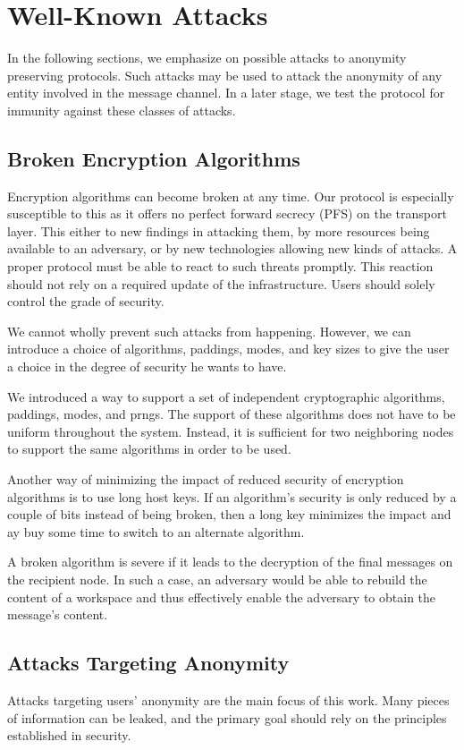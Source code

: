 \section{Well-Known Attacks}\label{sec:wellKnownAttacks}
In the following sections, we emphasize on possible attacks to anonymity preserving protocols. Such attacks may be used to attack the anonymity of any entity involved in the message channel. In a later stage, we test the protocol for immunity against these classes of attacks.

\subsection{Broken Encryption Algorithms}
Encryption algorithms can become broken at any time. Our protocol is especially susceptible to this as it offers no perfect forward secrecy (PFS) on the transport layer. This either to new findings in attacking them, by more resources being available to an adversary, or by new technologies allowing new kinds of attacks. A proper protocol must be able to react to such threats promptly. This reaction should not rely on a required update of the infrastructure. Users should solely control the grade of security. 

We cannot wholly prevent such attacks from happening. However, we can introduce a choice of algorithms, paddings, modes, and key sizes to give the user a choice in the degree of security he wants to have.

We introduced a way to support a set of independent cryptographic algorithms, paddings, modes, and prngs. The support of these algorithms does not have to be uniform throughout the system. Instead, it is sufficient for two neighboring nodes to support the same algorithms in order to be used. 

Another way of minimizing the impact of reduced security of encryption algorithms is to use long host keys. If an algorithm's security is only reduced by a couple of bits instead of being broken, then a long key minimizes the impact and ay buy some time to switch to an alternate algorithm. 

A broken algorithm is severe if it leads to the decryption of the final messages on the recipient node. In such a case, an adversary would be able to rebuild the content of a workspace and thus effectively enable the adversary to obtain the message's content.

\subsection{Attacks Targeting Anonymity}
Attacks targeting users' anonymity are the main focus of this work. Many pieces of information can be leaked, and the primary goal should rely on the principles established in security.

